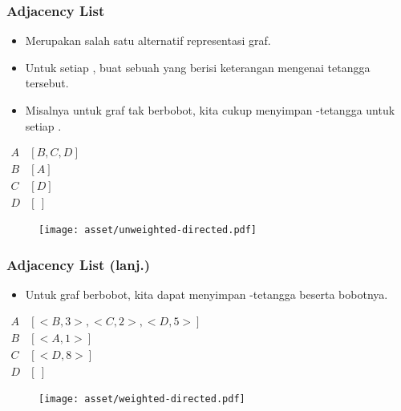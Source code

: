 \begin{frame}
\frametitle{Adjacency List}
\begin{itemize}
  \item Merupakan salah satu alternatif representasi graf.
  \item Untuk setiap \fnode, buat sebuah \flist yang berisi keterangan mengenai tetangga \fnode tersebut.
  \item Misalnya untuk graf tak berbobot, kita cukup menyimpan \fnode-\fnode tetangga untuk setiap \fnode.
\end{itemize}
\begin{center}
\begin{multicols}{2}
  $\begin{array}{r|l}
    A & [B, C, D] \\
    B & [A] \\
    C & [D] \\
    D & [\ ]
  \end{array}$
  \break
  \begin{figure}
    \texttt{[image: asset/unweighted-directed.pdf]}
  \end{figure}
\end{multicols} 
\end{center}
\end{frame}

\begin{frame}
\frametitle{Adjacency List (lanj.)}
\begin{itemize}
  \item Untuk graf berbobot, kita dapat menyimpan \fnode-\fnode tetangga beserta bobotnya.
\end{itemize}
\begin{center}
\begin{multicols}{2}
  $\begin{array}{r|l}
    A & [<B,3> , <C,2>, <D,5>] \\
    B & [<A,1>] \\
    C & [<D,8>] \\
    D & [\ ]
  \end{array}$
  \break
  \begin{figure}
    \texttt{[image: asset/weighted-directed.pdf]}
  \end{figure}
\end{multicols} 
\end{center}
\end{frame}

